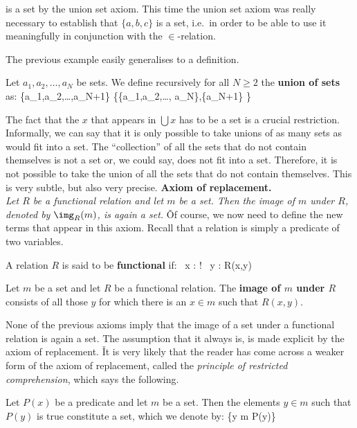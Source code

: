 is a set by the union set axiom. This time the union set axiom was really necessary to establish that $\{a,b,c\}$ is
a set, i.e.\ in order to be able to use it meaningfully in conjunction with the $\in$-relation.
\ee

The previous example easily generalises to a definition.

Let $a_1,a_2,\ldots,a_N$ be sets. We define recursively for all $N\geq 2$ the \textbf{union of sets} as:
\bse
\{a_1,a_2,\ldots,a_{N+1}\} \coloneqq \bigcup \left\{\{a_1,a_2,\ldots, a_{N}\},\{a_{N+1}\} \right\}
\ese
\ed

The fact that the $x$ that appears in $\bigcup x$ has to be a set is a crucial restriction. Informally, we can say
that it is only possible to take unions of as many sets as would fit into a set. The ``collection'' of all the sets
that do not contain themselves is not a set or, we could say, does not fit into a set. Therefore, it is not possible
to take the union of all the sets that do not contain themselves. This is very subtle, but also very precise. \v

\textbf{Axiom of replacement.} \\
\emph{Let $R$ be a functional relation and let $m$ be a set. Then the image of $m$ under $R$, denoted by $\img_R (m)$,
is again a set.} \v

Of course, we now need to define the new terms that appear in this axiom. Recall that a relation is simply a
predicate of two variables.

A relation $R$ is said to be \textbf{functional} if:
\bse
\forall \, x : \exists ! \, y : R(x,y)
\ese
\ed

Let $m$ be a set and let $R$ be a functional relation. The \textbf{image of $m$ under $R$} consists of all
those $y$ for which there is an $x\in m$ such that $R(x,y)$.
\ed

None of the previous axioms imply that the image of a set under a functional relation is again a set. The assumption
that it always is, is made explicit by the axiom of replacement. \v

It is very likely that the reader has come across a weaker form of the axiom of replacement, called the
\emph{principle of restricted comprehension}, which says the following.

Let $P(x)$ be a predicate and let $m$ be a set. Then the elements $y \in m$ such that $P(y)$ is true constitute a
set, which we denote by:
\bse
\{y \in m \mid P(y)\}
\ese
\et

